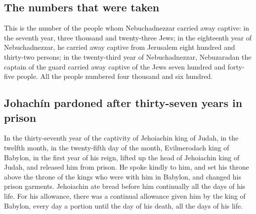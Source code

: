 \hypertarget{the-numbers-that-were-taken}{%
\subsection{The numbers that were
taken}\label{the-numbers-that-were-taken}}

 This is the number of the people whom Nebuchadnezzar
carried away captive: in the seventh year, three thousand and
twenty-three Jews;  in the eighteenth year of
Nebuchadnezzar, he carried away captive from Jerusalem eight hundred and
thirty-two persons;  in the twenty-third year of
Nebuchadnezzar, Nebuzaradan the captain of the guard carried away
captive of the Jews seven hundred and forty-five people. All the people
numbered four thousand and six hundred.

\hypertarget{johachuxedn-pardoned-after-thirty-seven-years-in-prison}{%
\subsection{Johachín pardoned after thirty-seven years in
prison}\label{johachuxedn-pardoned-after-thirty-seven-years-in-prison}}

 In the thirty-seventh year of the captivity of
Jehoiachin king of Judah, in the twelfth month, in the twenty-fifth day
of the month, Evilmerodach king of Babylon, in the first year of his
reign, lifted up the head of Jehoiachin king of Judah, and released him
from prison.  He spoke kindly to him, and set his throne
above the throne of the kings who were with him in Babylon,
 and changed his prison garments. Jehoiachin ate bread
before him continually all the days of his life.  For his
allowance, there was a continual allowance given him by the king of
Babylon, every day a portion until the day of his death, all the days of
his life.
